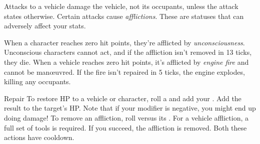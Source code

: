 
Attacks to a vehicle damage the vehicle, not its occupants, unless the attack states otherwise. Certain attacks cause \emph{afflictions}. These are statuses that can adversely affect your stats.

When a character reaches zero hit points, they're afflicted by \emph{unconsciousness}. Unconscious characters cannot act, and if the affliction isn't removed in 13 ticks, they die. When a vehicle reaches zero hit points, it's afflicted by \emph{engine fire} and cannot be man\oe{}uvred. If the fire isn't repaired in 5 ticks, the engine explodes, killing any occupants.

\begin{abstractsection}{Repair}
To restore HP to a vehicle or character, roll a  and add your . Add the result to the target's HP. Note that if your modifier is negative, you might end up doing damage! To remove an affliction, roll  versus its . For a vehicle affliction, a full set of tools is required. If you succeed, the affliction is removed. Both these actions have \duration{\durationLong} cooldown.
\end{abstractsection}
